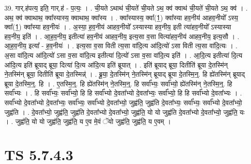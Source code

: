 \documentclass[17pt]{extarticle}
\begin{document}
39. गार्.ह॑पत्य॒ इति॒ गार्.ह॑ - प॒त्यः॒ । . ची॒यते ऽथाथ॑ ची॒यते॑ ची॒यते ऽथ॒ क्व॑ क्वाथ॑ ची॒यते॑ ची॒यते ऽथ॒ क्व॑ । . अथ॒ क्व॑ क्वाथाथ॒ क्वा᳚स्यास्य॒ क्वाथाथ॒ क्वा᳚स्य । . क्वा᳚स्यास्य॒ क्वा᳚(1॒) क्वा᳚स्या हव॒नीय॑ आहव॒नीयो᳚ ऽस्य॒ क्वा᳚(1॒) क्वा᳚स्या हव॒नीयः॑ । . अ॒स्या॒ ह॒व॒नीय॑ आहव॒नीयो᳚ ऽस्यास्या हव॒नीय॒ इती त्या॑हव॒नीयो᳚ ऽस्यास्या हव॒नीय॒ इति॑ । . आ॒ह॒व॒नीय॒ इतीत्या॑ हव॒नीय॑ आहव॒नीय॒ इत्य॒सा व॒सा वित्या॑हव॒नीय॑ आहव॒नीय॒ इत्य॒सौ । . आ॒ह॒व॒नीय॒ इत्या᳚ - ह॒व॒नीयः॑ । . इत्य॒सा व॒सा विती त्य॒सा वा॑दि॒त्य आ॑दि॒त्यो॑ ऽसा विती त्य॒सा वा॑दि॒त्यः । . अ॒सा वा॑दि॒त्य आ॑दि॒त्यो॑ ऽसा व॒सा वा॑दि॒त्य इतीत्या॑ दि॒त्यो॑ ऽसा व॒सा वा॑दि॒त्य इति॑ । . आ॒दि॒त्य इतीत्या॑ दि॒त्य आ॑दि॒त्य इति॑ ब्रूयाद् ब्रूया॒ दित्या॑ दि॒त्य आ॑दि॒त्य इति॑ ब्रूयात् । . इति॑ ब्रूयाद् ब्रूया॒ दितीति॑ ब्रूया दे॒तस्मि॑न् ने॒तस्मि॑न् ब्रूया॒ दितीति॑ ब्रूया दे॒तस्मिन्न्॑ । . ब्रू॒या॒ दे॒तस्मि॑न् ने॒तस्मि॑न् ब्रूयाद् ब्रूया दे॒तस्मि॒न्॒. हि ह्ये॑तस्मि॑न् ब्रूयाद् ब्रूया दे॒तस्मि॒न्॒. हि । . ए॒तस्मि॒न्॒. हि ह्ये॑तस्मि॑न् ने॒तस्मि॒न्॒. हि सर्वा᳚भ्यः॒ सर्वा᳚भ्यो॒ ह्ये॑तस्मि॑न् ने॒तस्मि॒न्॒. हि सर्वा᳚भ्यः । . हि सर्वा᳚भ्यः॒ सर्वा᳚भ्यो॒ हि हि सर्वा᳚भ्यो दे॒वता᳚भ्यो दे॒वता᳚भ्यः॒ सर्वा᳚भ्यो॒ हि हि सर्वा᳚भ्यो दे॒वता᳚भ्यः । . सर्वा᳚भ्यो दे॒वता᳚भ्यो दे॒वता᳚भ्यः॒ सर्वा᳚भ्यः॒ सर्वा᳚भ्यो दे॒वता᳚भ्यो॒ जुह्व॑ति॒ जुह्व॑ति दे॒वता᳚भ्यः॒ सर्वा᳚भ्यः॒ सर्वा᳚भ्यो दे॒वता᳚भ्यो॒ जुह्व॑ति । . दे॒वता᳚भ्यो॒ जुह्व॑ति॒ जुह्व॑ति दे॒वता᳚भ्यो दे॒वता᳚भ्यो॒ जुह्व॑ति॒ यो यो जुह्व॑ति दे॒वता᳚भ्यो दे॒वता᳚भ्यो॒ जुह्व॑ति॒ यः । . जुह्व॑ति॒ यो यो जुह्व॑ति॒ जुह्व॑ति॒ य ए॒व मे॒वं ॅयो जुह्व॑ति॒ जुह्व॑ति॒ य ए॒वम् । \newline
\pagebreak
{}

\section{ TS 5.7.4.3 }
\end{document}
